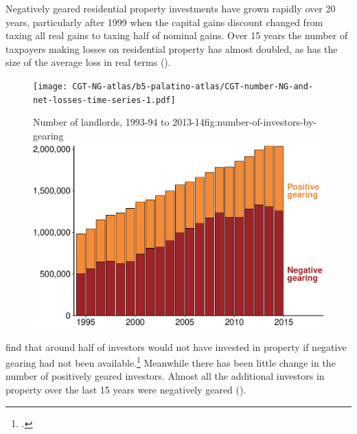 Negatively geared residential property investments have grown rapidly over 20 years, particularly after 1999 when the capital gains discount changed from taxing all real gains to taxing half of nominal gains. 
Over 15 years the number of taxpayers making losses on residential property has almost doubled, as has the size of the average loss in real terms ().  

\begin{figure}[p]
\begin{minipage}[c][\textheight]{\linewidth}
\label{fig:number-NG-and-net-losses-time-series}
\texttt{[image: CGT-NG-atlas/b5-palatino-atlas/CGT-number-NG-and-net-losses-time-series-1.pdf]}


\vfill
{}%
{Number of landlords, 1993-94 to 2013-14}{fig:number-of-investors-by-gearing}
\includegraphics[width=\columnwidth]{CGT-NG-atlas//number-of-investors-by-gearing-1}

\end{minipage}
\end{figure}






\textcite{seelig2009understanding} find that around half of investors would not have invested in property if negative gearing had not been available.\footcite[][63]{seelig2009understanding} 
Meanwhile there has been little change in the number of positively geared investors. Almost all the additional investors in property over the last 15 years were negatively geared ().

